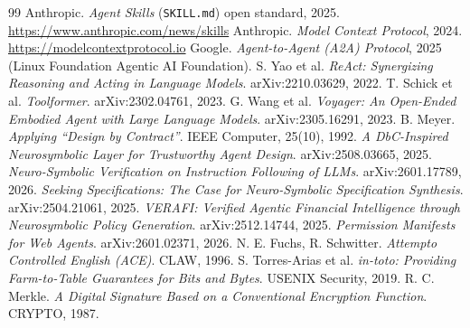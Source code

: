 \documentclass[11pt]{article}
\begin{document}
\begin{thebibliography}{99}
\small
{} Anthropic. \emph{Agent Skills} (\texttt{SKILL.md}) open
standard, 2025. \url{https://www.anthropic.com/news/skills}
 Anthropic. \emph{Model Context Protocol}, 2024.
\url{https://modelcontextprotocol.io}
 Google. \emph{Agent-to-Agent (A2A) Protocol}, 2025 (Linux
Foundation Agentic AI Foundation).
 S. Yao et al. \emph{ReAct: Synergizing Reasoning and Acting in
Language Models}. arXiv:2210.03629, 2022.
 T. Schick et al. \emph{Toolformer}. arXiv:2302.04761, 2023.
 G. Wang et al. \emph{Voyager: An Open-Ended Embodied Agent with
Large Language Models}. arXiv:2305.16291, 2023.
 B. Meyer. \emph{Applying ``Design by Contract''}. IEEE Computer,
25(10), 1992.
 \emph{A DbC-Inspired Neurosymbolic Layer for Trustworthy Agent
Design}. arXiv:2508.03665, 2025.
 \emph{Neuro-Symbolic Verification on Instruction Following of
LLMs}. arXiv:2601.17789, 2026.
 \emph{Seeking Specifications: The Case for Neuro-Symbolic
Specification Synthesis}. arXiv:2504.21061, 2025.
 \emph{VERAFI: Verified Agentic Financial Intelligence through
Neurosymbolic Policy Generation}. arXiv:2512.14744, 2025.
 \emph{Permission Manifests for Web Agents}.
arXiv:2601.02371, 2026.
 N. E. Fuchs, R. Schwitter. \emph{Attempto Controlled English
(ACE)}. CLAW, 1996.
 S. Torres-Arias et al. \emph{in-toto: Providing Farm-to-Table
Guarantees for Bits and Bytes}. USENIX Security, 2019.
 R. C. Merkle. \emph{A Digital Signature Based on a Conventional
Encryption Function}. CRYPTO, 1987.
\end{thebibliography}
\end{document}
